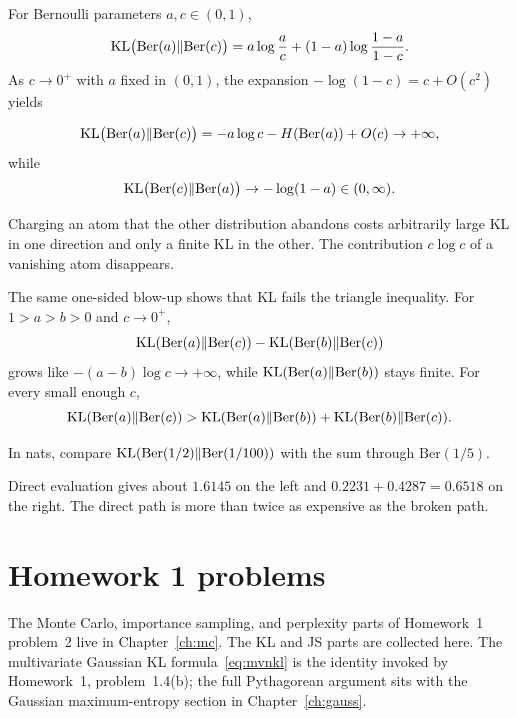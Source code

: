 For Bernoulli parameters $a,c\in(0,1)$,
\[
\mathrm{KL}\bigl(\mathrm{Ber}(a)\Vert\mathrm{Ber}(c)\bigr)
=a\log\frac ac+(1-a)\log\frac{1-a}{1-c}.
\]
As $c\to 0^+$ with $a$ fixed in $(0,1)$, the expansion $-\log(1-c)=c+O(c^2)$ yields
\begin{resultbox}
\[
\mathrm{KL}\bigl(\mathrm{Ber}(a)\Vert\mathrm{Ber}(c)\bigr)=-a\log c-H(\mathrm{Ber}(a))+O(c)\to+\infty,
\]
while
\[
\mathrm{KL}\bigl(\mathrm{Ber}(c)\Vert\mathrm{Ber}(a)\bigr)\to-\log(1-a)\in(0,\infty).
\]
\end{resultbox}
Charging an atom that the other distribution abandons costs arbitrarily large KL in one direction and only a finite KL in the other. The contribution $c\log c$ of a vanishing atom disappears.

The same one-sided blow-up shows that KL fails the triangle inequality. For $1>a>b>0$ and $c\to 0^+$,
\[
\mathrm{KL}(\mathrm{Ber}(a)\Vert\mathrm{Ber}(c))-\mathrm{KL}(\mathrm{Ber}(b)\Vert\mathrm{Ber}(c))
\]
grows like $-(a-b)\log c\to+\infty$, while $\mathrm{KL}(\mathrm{Ber}(a)\Vert\mathrm{Ber}(b))$ stays finite. For every small enough $c$,
\[
\mathrm{KL}(\mathrm{Ber}(a)\Vert\mathrm{Ber}(c))
>\mathrm{KL}(\mathrm{Ber}(a)\Vert\mathrm{Ber}(b))+\mathrm{KL}(\mathrm{Ber}(b)\Vert\mathrm{Ber}(c)).
\]

\begin{practbox}
In nats, compare $\mathrm{KL}(\mathrm{Ber}(1/2)\Vert\mathrm{Ber}(1/100))$ with the sum through $\mathrm{Ber}(1/5)$.
\end{practbox}
\begin{solbox}
Direct evaluation gives about $1.6145$ on the left and $0.2231+0.4287=0.6518$ on the right. The direct path is more than twice as expensive as the broken path.
\end{solbox}

\section{Homework 1 problems}

The Monte Carlo, importance sampling, and perplexity parts of Homework~1 problem~2 live in Chapter~\ref{ch:mc}. The KL and JS parts are collected here. The multivariate Gaussian KL formula~\eqref{eq:mvnkl} is the identity invoked by Homework~1, problem~1.4(b); the full Pythagorean argument sits with the Gaussian maximum-entropy section in Chapter~\ref{ch:gauss}.

